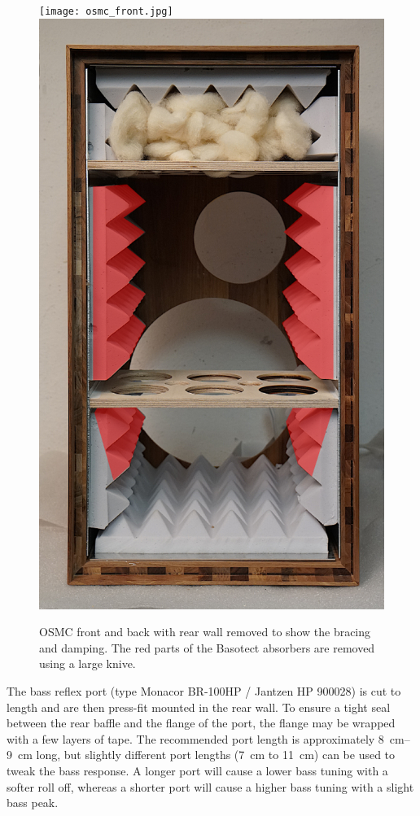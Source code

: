 \documentclass[12pt,a4paper]{article}
\providecommand{\figlabel}[1]{\label{fig:#1}}
\begin{document}
\begin{figure}[tbp]
	\centering
	\texttt{[image: osmc\_front.jpg]}
	\hfill
	\includegraphics[height=0.55\textheight]{osmc_cabinet_open_damping.pdf}
	\caption{OSMC front and back with rear wall removed to show the bracing and damping. The red parts of the Basotect absorbers are removed using a large knive.}
	\figlabel{osmc_photos}
\end{figure}

The bass reflex port (type Monacor BR-100HP / Jantzen HP 900028) is cut to length and are then press-fit mounted in the rear wall. To ensure a tight seal between the rear baffle and the flange of the port, the flange may be wrapped with a few layers of tape. The recommended port length is approximately \SIrange{8}{9}{cm} long\cite{osmc_p918}, but slightly different port lengths (\SI{7}{cm} to \SI{11}{cm}) can be used to tweak the bass response. A longer port will cause a lower bass tuning with a softer roll off, whereas a shorter port will cause a higher bass tuning with a slight bass peak.
\end{document}
